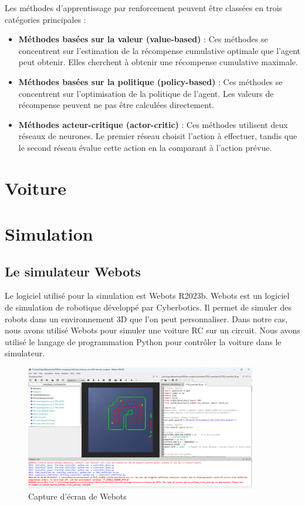 \documentclass[french]{article}
\begin{document}
\vspace{0.5cm}
\noindent
Les méthodes d'apprentissage par renforcement peuvent être classées en trois catégories principales :
\begin{itemize}
\item \textbf{Méthodes basées sur la valeur (value-based)} : Ces méthodes se concentrent sur l'estimation de la récompense cumulative optimale que l'agent peut obtenir. Elles cherchent à obtenir une récompense cumulative maximale.
\item \textbf{Méthodes basées sur la politique (policy-based)} : Ces méthodes se concentrent sur l'optimisation de la politique de l'agent. Les valeurs de récompense peuvent ne pas être calculées directement.
\item \textbf{Méthodes acteur-critique (actor-critic)} : Ces méthodes utilisent deux réseaux de neurones. Le premier réseau choisit l'action à effectuer, tandis que le second réseau évalue cette action en la comparant à l'action prévue.
\end{itemize}



\section{Voiture}

\section{Simulation}

\subsection{Le simulateur Webots}
Le logiciel utilisé pour la simulation est Webots R2023b. Webots est un logiciel de simulation de robotique développé 
par Cyberbotics. Il permet de simuler des robots dans un environnement 3D que l'on peut personnaliser. Dans notre cas,
nous avons utilisé Webots pour simuler une voiture RC sur un circuit. Nous avons utilisé le langage de programmation
Python pour contrôler la voiture dans le simulateur.

\begin{figure}[H]
    \centering
    \includegraphics[width=0.9\textwidth]{Images/Webots.png}
    \caption{Capture d'écran de Webots}
\end{figure}
\end{document}
